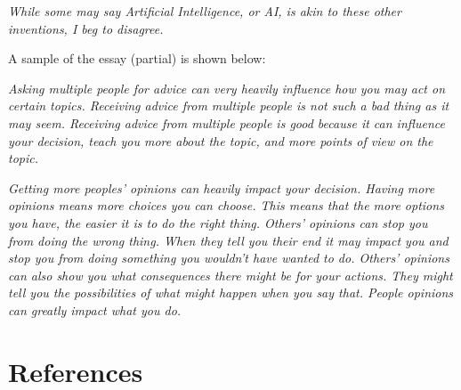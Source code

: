 \documentclass[12pt]{article}
\begin{document}
{\begin{displayquote}
\emph{While some may say Artificial Intelligence, or AI, is akin to these other inventions, I beg to disagree.}
\end{displayquote}


A sample of the essay (partial) is shown below:
\begin{displayquote}
\textit{Asking multiple people for advice can very heavily influence how you may act on certain topics. Receiving advice from multiple people is not such a bad thing as it may seem. Receiving advice from multiple people is good because it can influence your decision, teach you more about the topic, and more points of view on the topic.}

\textit{Getting more peoples' opinions can heavily impact your decision. Having more opinions means more choices you can choose. This means that the more options you have, the easier it is to do the right thing. Others' opinions can stop you from doing the wrong thing. When they tell you their end it may impact you and stop you from doing something you wouldn't have wanted to do. Others' opinions can also show you what consequences there might be for your actions. They might tell you the possibilities of what might happen when you say that. People opinions can greatly impact what you do.}

\end{displayquote}



\section{References}

\printbibliography[
heading=none
]
}
\end{document}
